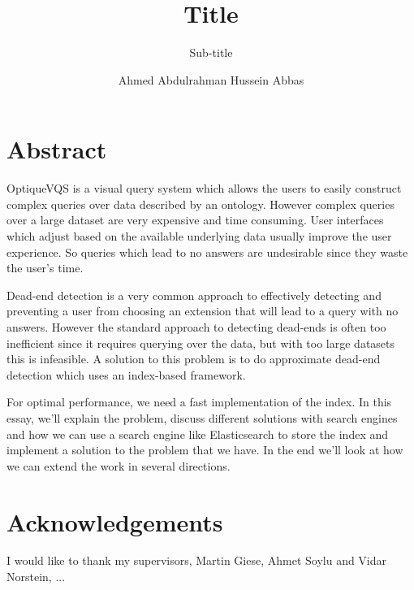\documentclass[a4paper,english]{ifimaster/ifimaster}
\title{Title}
\subtitle{Sub-title}
\author{Ahmed Abdulrahman Hussein Abbas}
\begin{document}
\duoforside[dept={Department of Informatics},
program={Informatics: Programming and System Architecture},
long]

\frontmatter{}
\chapter*{Abstract}

OptiqueVQS is a visual query system which allows the users to easily construct complex queries over data described by an ontology. However complex queries over a large dataset are very expensive and time consuming. User interfaces which adjust based on the available underlying data usually improve the user experience. So queries which lead to no answers are undesirable since they waste the user's time. 

Dead-end detection is a very common approach to effectively detecting and preventing a user from choosing an extension that will lead to a query with no answers. However the standard approach to detecting dead-ends is often too inefficient since it requires querying over the data, but with too large datasets this is infeasible. A solution to this problem is to do approximate dead-end detection which uses an index-based framework.

For optimal performance, we need a fast implementation of the index. In this essay, we'll explain the problem, discuss different solutions with search engines and how we can use a search engine like Elasticsearch to store the index and implement a solution to the problem that we have. In the end we'll look at how we can extend the work in several directions. 

\chapter*{}

\chapter*{Acknowledgements}

I would like to thank my supervisors, Martin Giese, Ahmet Soylu and Vidar Norstein, ...

\chapter*{}

\tableofcontents{}

\chapter*{}
\end{document}
